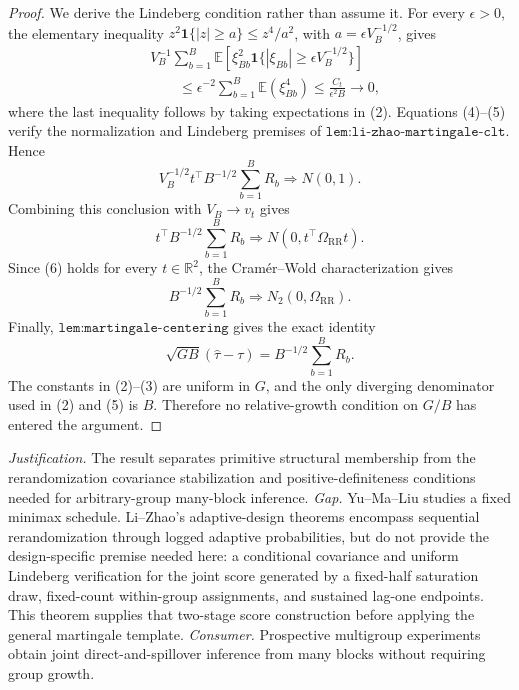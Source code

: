 \documentclass{article}
\begin{document}
\begin{proof}
We derive the Lindeberg condition rather than assume it.  For every \(\epsilon>0\), the elementary inequality \(z^2\mathbf1\{|z|\geq a\}\leq z^4/a^2\), with \(a=\epsilon V_B^{-1/2}\), gives
\[
 \begin{aligned}
 &V_B^{-1}\sum_{b=1}^B
  \mathbb E\left[\xi_{Bb}^2
   \mathbf1\{|\xi_{Bb}|\geq\epsilon V_B^{-1/2}\}\right]\\
 &\qquad\leq
 \epsilon^{-2}\sum_{b=1}^B\mathbb E(\xi_{Bb}^4)
 \leq \frac{C_t}{\epsilon^2B}\longrightarrow0,            \tag{5}
 \end{aligned}
\]
where the last inequality follows by taking expectations in (2).  Equations (4)--(5) verify the normalization and Lindeberg premises of \(\texttt{lem:li-zhao-martingale-clt}\).  Hence
\[
 V_B^{-1/2}t^\top B^{-1/2}\sum_{b=1}^BR_b\Rightarrow N(0,1).
\]
Combining this conclusion with \(V_B\to v_t\) gives
\[
 t^\top B^{-1/2}\sum_{b=1}^BR_b
 \Rightarrow N(0,t^\top\Omega_{\mathrm{RR}}t).             \tag{6}
\]
Since (6) holds for every \(t\in\mathbb R^2\), the Cram\'er--Wold characterization gives
\[
 B^{-1/2}\sum_{b=1}^BR_b\Rightarrow N_2(0,\Omega_{\mathrm{RR}}).
\]
Finally, \(\texttt{lem:martingale-centering}\) gives the exact identity
\[
 \sqrt{GB}(\widehat\tau-\tau)=B^{-1/2}\sum_{b=1}^BR_b.
\]
The constants in (2)--(3) are uniform in \(G\), and the only diverging denominator used in (2) and (5) is \(B\).  Therefore no relative-growth condition on \(G/B\) has entered the argument.
\end{proof}
\par\smallskip\noindent \textit{Justification.} The result separates primitive structural membership from the rerandomization covariance stabilization and positive-definiteness conditions needed for arbitrary-group many-block inference. \textit{Gap.} Yu--Ma--Liu studies a fixed minimax schedule. Li--Zhao's adaptive-design theorems encompass sequential rerandomization through logged adaptive probabilities, but do not provide the design-specific premise needed here: a conditional covariance and uniform Lindeberg verification for the joint score generated by a fixed-half saturation draw, fixed-count within-group assignments, and sustained lag-one endpoints. This theorem supplies that two-stage score construction before applying the general martingale template. \textit{Consumer.} Prospective multigroup experiments obtain joint direct-and-spillover inference from many blocks without requiring group growth.
\end{document}
